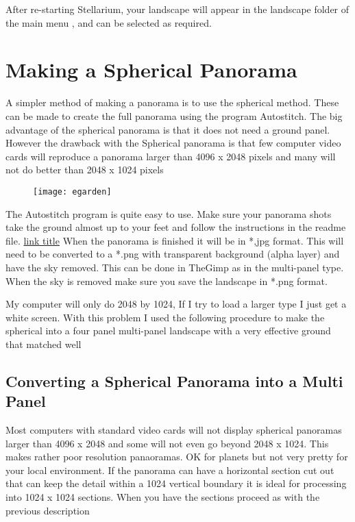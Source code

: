 After re-starting Stellarium, your landscape will appear in the
landscape folder of the main menu , and can be selected as required.

\section{Making a Spherical Panorama}
\label{making-a-spherical-panorama}

A simpler method of making a panorama is to use the spherical method.
These can be made to create the full panorama using the program
Autostitch. The big advantage of the spherical panorama is that it does
not need a ground panel. However the drawback with the Spherical
panorama is that few computer video cards will reproduce a panorama
larger than 4096 x 2048 pixels and many will not do better than 2048 x
1024 pixels

\begin{figure}[h]
\centering\texttt{[image: egarden]}
\end{figure}

The Autostitch program is quite easy to use. Make sure your panorama
shots take the ground almost up to your feet and follow the instructions
in the readme file. \href{http://www.example.com}{link title} When the
panorama is finished it will be in *,jpg format. This will need to be
converted to a *.png with transparent background (alpha layer) and have
the sky removed. This can be done in TheGimp as in the multi-panel type.
When the sky is removed make sure you save the landscape in *.png
format.

My computer will only do 2048 by 1024, If I try to load a larger type I
just get a white screen. With this problem I used the following
procedure to make the spherical into a four panel multi-panel landscape
with a very effective ground that matched well

\subsection{Converting a Spherical Panorama into a Multi Panel}
\label{converting-a-spherical-panorama-into-a-multi-panel}

Most computers with standard video cards will not display spherical
panoramas larger than 4096 x 2048 and some will not even go beyond 2048
x 1024. This makes rather poor resolution panaoramas. OK for planets but
not very pretty for your local environment. If the panorama can have a
horizontal section cut out that can keep the detail within a 1024
vertical boundary it is ideal for processing into 1024 x 1024 sections.
When you have the sections proceed as with the previous description


